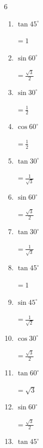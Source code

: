 \begin{multicols}{6}
\begin{enumerate}
        $\displaystyle =\frac{1}{2}$

  \item $\displaystyle \tan{45^\circ}$

        $\displaystyle =1$

  \item $\displaystyle \sin{60^\circ}$

        $\displaystyle =\frac{\sqrt{3}}{2}$

  \item $\displaystyle \sin{30^\circ}$

        $\displaystyle =\frac{1}{2}$

  \item $\displaystyle \cos{60^\circ}$

        $\displaystyle =\frac{1}{2}$

  \item $\displaystyle \tan{30^\circ}$

        $\displaystyle =\frac{1}{\sqrt{3}}$

  \item $\displaystyle \sin{60^\circ}$

        $\displaystyle =\frac{\sqrt{3}}{2}$

  \item $\displaystyle \tan{30^\circ}$

        $\displaystyle =\frac{1}{\sqrt{3}}$

  \item $\displaystyle \tan{45^\circ}$

        $\displaystyle =1$

  \item $\displaystyle \sin{45^\circ}$

        $\displaystyle =\frac{1}{\sqrt{2}}$

  \item $\displaystyle \cos{30^\circ}$

        $\displaystyle =\frac{\sqrt{3}}{2}$

  \item $\displaystyle \tan{60^\circ}$

        $\displaystyle =\sqrt{3}$

  \item $\displaystyle \sin{60^\circ}$

        $\displaystyle =\frac{\sqrt{3}}{2}$

  \item $\displaystyle \tan{45^\circ}$


\end{enumerate}
\end{multicols}
